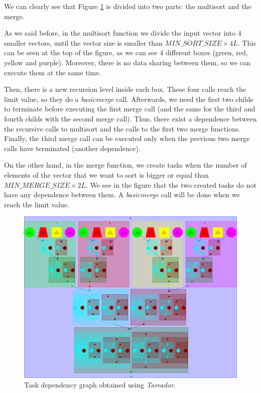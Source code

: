 \documentclass[12pt, a4paper]{article}
\begin{document}
We can clearly see that Figure \ref{fig:TDG} is divided into two parts: the multisort and the merge.

As we said before, in the multisort function we divide the input vector into 4 smaller vectors, until the vector size is smaller than $MIN\_SORT\_SIZE \times 4L$. This can be seen at the top of the figure, as we can see 4 different boxes (green, red, yellow and purple). Moreover, there is no data sharing between them, so we can execute them at the same time.

Then, there is a new recursion level inside each box. These four calls reach the limit value, so they do a \textit{basicmerge} call. Afterwards, we need the first two childs to terminate before executing the first merge call (and the same for the third and fourth childs with the second merge call). Thus, there exist a dependence between the recursive calls to multisort and the calls to the first two merge functions. Finally, the third merge call can be executed only when the previous two merge calls have terminated (another dependence).

On the other hand, in the merge function, we create tasks when the number of elements of the vector that we want to sort is bigger or equal than $MIN\_MERGE\_SIZE \times 2L$. We see in the figure that the two created tasks do not have any dependence between them. A \textit{basicmerge} call will be done when we reach the limit value.

\begin{figure}[H]
	\centering
	\includegraphics[scale=0.16]{./images/dependency_graph}
	
	\label{fig:TDG}
	\caption{Task dependency graph obtained using \textit{Tareador}.}
\end{figure}
\end{document}
